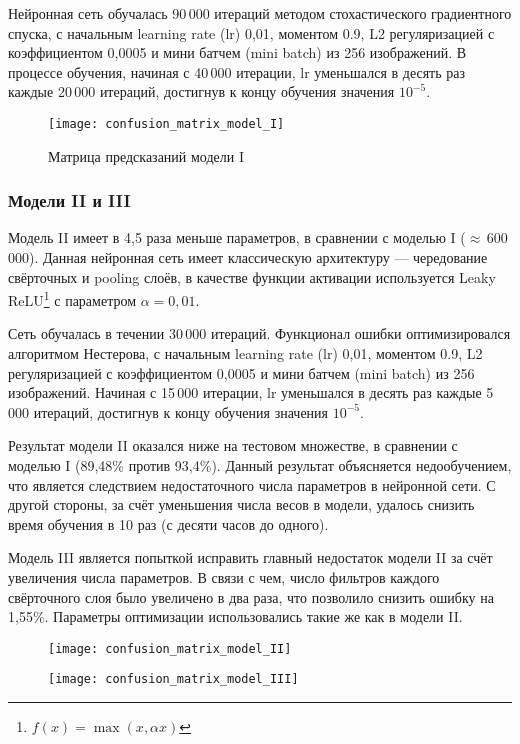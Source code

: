Нейронная сеть обучалась 90\,000 итераций методом стохастического градиентного спуска,
с начальным learning rate (lr) 0,01, моментом 0.9, L2 регуляризацией с коэффициентом 0,0005 и 
мини батчем (mini batch) из 256 изображений. В процессе обучения, начиная с 40\,000 итерации, 
lr уменьшался в десять раз каждые 20\,000 итераций, достигнув к концу обучения значения $10^{-5}$.

\begin{figure}[H]
    \centering
    \texttt{[image: confusion\_matrix\_model\_I]}
    \vspace*{-1cm}
    \caption{Матрица предсказаний модели I}
    \label{fig:confusion_matrix_model_I}
\end{figure}

\subsubsection{Модели II и III}
Модель II имеет в 4,5 раза меньше параметров, в сравнении с моделью I ($\approx$\,600\,000).
Данная нейронная сеть имеет классическую архитектуру --- чередование свёрточных и pooling слоёв, в качестве
функции активации используется Leaky ReLU\footnote{$f(x) = \max(x, \alpha x)$} с параметром $\alpha = 0,01$.

Сеть обучалась в течении 30\,000 итераций. Функционал ошибки оптимизировался алгоритмом Нестерова,
с начальным learning rate (lr) 0,01, моментом 0.9, L2 регуляризацией с коэффициентом 0,0005 и 
мини батчем (mini batch) из 256 изображений. Начиная с 15\,000 итерации, 
lr уменьшался в десять раз каждые 5\,000 итераций, достигнув к концу обучения значения $10^{-5}$.

Результат модели II оказался ниже на тестовом множестве, в сравнении с моделью I (89,48\% против 93,4\%).
Данный результат объясняется недообучением, что является следствием недостаточного числа параметров в нейронной сети.
С другой стороны, за счёт уменьшения числа весов в модели, удалось снизить время обучения в 10 раз (с десяти часов до одного).

Модель III является попыткой исправить главный недостаток модели II за счёт увеличения числа параметров.
В связи с чем, число фильтров каждого свёрточного слоя было увеличено в два раза, что позволило снизить ошибку на 1,55\%.
Параметры оптимизации использовались такие же как в модели II.

\begin{figure}[H]
\centering
\begin{minipage}{.5\textwidth}
  \centering
  \texttt{[image: confusion\_matrix\_model\_II]}
  \vspace*{-1.7cm}
\end{minipage}%
\begin{minipage}{.5\textwidth}
  \centering
  \texttt{[image: confusion\_matrix\_model\_III]}
  \vspace*{-1.7cm}
\end{minipage}
\end{figure}


